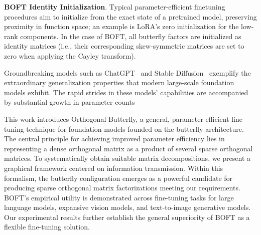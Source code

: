 \textbf{BOFT Identity Initialization}. Typical parameter-efficient finetuning procedures aim to initialize from the exact state of a pretrained model, preserving proximity in function space; an example is LoRA’s zero initialization for the low-rank components. In the case of BOFT, all butterfly factors are initialized as identity matrices (i.e., their corresponding skew-symmetric matrices are set to zero when applying the Cayley transform).

Groundbreaking models such as ChatGPT~\cite{brown2020language,chen2021evaluating} and Stable Diffusion~\cite{rombach2022high} exemplify the extraordinary generalization properties that modern large-scale foundation models exhibit. The rapid strides in these models’ capabilities are accompanied by substantial growth in parameter counts

This work introduces Orthogonal Butterfly, a general, parameter-efficient fine-tuning technique for foundation models founded on the butterfly architecture. The central principle for achieving improved parameter efficiency lies in representing a dense orthogonal matrix as a product of several sparse orthogonal matrices. To systematically obtain suitable matrix decompositions, we present a graphical framework centered on information transmission. Within this formalism, the butterfly configuration emerges as a powerful candidate for producing sparse orthogonal matrix factorizations meeting our requirements. BOFT’s empirical utility is demonstrated across fine-tuning tasks for large language models, expansive vision models, and text-to-image generative models. Our experimental results further establish the general superiority of BOFT as a flexible fine-tuning solution.

